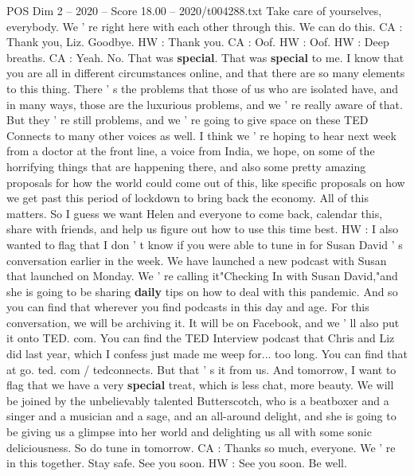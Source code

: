 \begin{textsample}{POS Dim 2 – 2020 – Score 18.00 – 2020/t004288.txt}
Take care of yourselves, everybody.
We ' re right here with each other through this.
We can do this.
CA : Thank you, Liz.
Goodbye.
HW : Thank you.
CA : Oof.
HW : Oof.
HW : Deep breaths.
CA : Yeah.
No.
That was \textbf{special}.
That was \textbf{special} to me.
I know that you are all in different circumstances online, and that there are so many elements to this thing.
There ' s the problems that those of us who are isolated have, and in many ways, those are the luxurious problems, and we ' re really aware of that.
But they ' re still problems, and we ' re going to give space on these TED Connects to many other voices as well.
I think we ' re hoping to hear next week from a doctor at the front line, a voice from India, we hope, on some of the horrifying things that are happening there, and also some pretty amazing proposals for how the world could come out of this, like specific proposals on how we get past this period of lockdown to bring back the economy.
All of this matters.
So I guess we want Helen and everyone to come back, calendar this, share with friends, and help us figure out how to use this time best.
HW : I also wanted to flag that I don ' t know if you were able to tune in for Susan David ' s conversation earlier in the week.
We have launched a new podcast with Susan that launched on Monday.
We ' re calling it"Checking In with Susan David,"and she is going to be sharing \textbf{daily} tips on how to deal with this pandemic.
And so you can find that wherever you find podcasts in this day and age.
For this conversation, we will be archiving it.
It will be on Facebook, and we ' ll also put it onto TED. com.
You can find the TED Interview podcast that Chris and Liz did last year, which I confess just made me weep for... too long.
You can find that at go. ted. com / tedconnects.
But that ' s it from us.
And tomorrow, I want to flag that we have a very \textbf{special} treat, which is less chat, more beauty.
We will be joined by the unbelievably talented Butterscotch, who is a beatboxer and a singer and a musician and a sage, and an all-around delight, and she is going to be giving us a glimpse into her world and delighting us all with some sonic deliciousness.
So do tune in tomorrow.
CA : Thanks so much, everyone.
We ' re in this together.
Stay safe.
See you soon.
HW : See you soon.
Be well.

\end{textsample}
